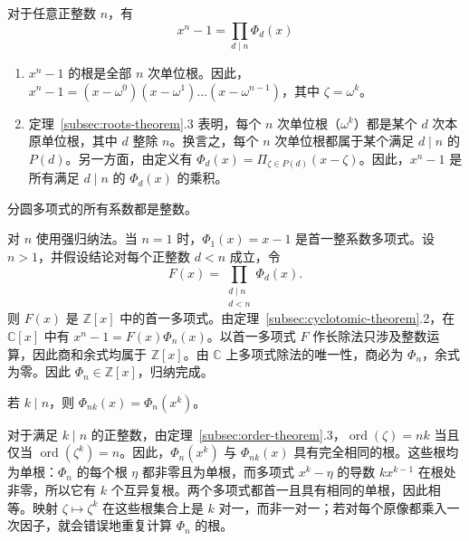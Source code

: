 \begin{tcolorbox}[title={\textbf{\tboxtheorem{\ref*{subsec:cyclotomic-theorem}.2} 将多项式分解为分圆多项式的乘积}}]
对于任意正整数 $n$，有 \[ x^n - 1 = \prod_{d \mid n} \Phi_d(x) \]
\end{tcolorbox}
\begin{myproof}
\begin{enumerate}
    \item $x^n - 1$ 的根是全部 $n$ 次单位根。因此，$x^n - 1 = (x - \omega^0)(x - \omega^1)...(x - \omega^{n-1})$，其中 $\zeta = \omega^k$。
    \item 定理~\ref*{subsec:roots-theorem}.3 表明，每个 $n$ 次单位根（$\omega^k$）都是某个 $d$ 次本原单位根，其中 $d$ 整除 $n$。换言之，每个 $n$ 次单位根都属于某个满足 $d \mid n$ 的 $P(d)$。另一方面，由定义有 $\Phi_d(x) = \Pi_{\zeta \in P(d)} (x - \zeta)$。因此，$x^n - 1$ 是所有满足 $d \mid n$ 的 $\Phi_d(x)$ 的乘积。
\end{enumerate}
\end{myproof}
\begin{tcolorbox}[title={\textbf{\tboxtheorem{\ref*{subsec:cyclotomic-theorem}.3} 分圆多项式的整数系数性质}}]
分圆多项式的所有系数都是整数。
\end{tcolorbox}
\begin{myproof}
对 $n$ 使用强归纳法。当 $n=1$ 时，$\Phi_1(x)=x-1$ 是首一整系数多项式。设 $n>1$，并假设结论对每个正整数 $d<n$ 成立，令
\[
F(x)=\prod_{\substack{d\mid n\\d<n}}\Phi_d(x).
\]
则 $F(x)$ 是 $\mathbb{Z}[x]$ 中的首一多项式。由定理~\ref*{subsec:cyclotomic-theorem}.2，在 $\mathbb{C}[x]$ 中有 $x^n-1=F(x)\Phi_n(x)$。以首一多项式 $F$ 作长除法只涉及整数运算，因此商和余式均属于 $\mathbb{Z}[x]$。由 $\mathbb{C}$ 上多项式除法的唯一性，商必为 $\Phi_n$，余式为零。因此 $\Phi_n\in\mathbb{Z}[x]$，归纳完成。
\end{myproof}
\begin{tcolorbox}[title={\textbf{\tboxtheorem{\ref*{subsec:cyclotomic-theorem}.4} $\bm{\Phi_{nk}(x)}$ 的公式}}]
若 $k \mid n$，则 $\Phi_{nk}(x) = \Phi_n(x^k)$。
\end{tcolorbox}
\begin{myproof}
对于满足 $k\mid n$ 的正整数，由定理~\ref*{subsec:order-theorem}.3，$\operatorname{ord}(\zeta)=nk$ 当且仅当 $\operatorname{ord}(\zeta^k)=n$。因此，$\Phi_n(x^k)$ 与 $\Phi_{nk}(x)$ 具有完全相同的根。这些根均为单根：$\Phi_n$ 的每个根 $\eta$ 都非零且为单根，而多项式 $x^k-\eta$ 的导数 $kx^{k-1}$ 在根处非零，所以它有 $k$ 个互异复根。两个多项式都首一且具有相同的单根，因此相等。映射 $\zeta\mapsto\zeta^k$ 在这些根集合上是 $k$ 对一，而非一对一；若对每个原像都乘入一次因子，就会错误地重复计算 $\Phi_n$ 的根。
\end{myproof}
